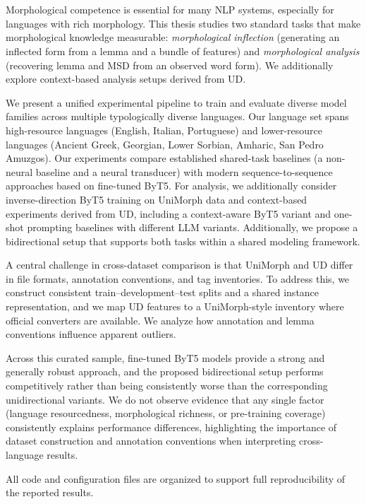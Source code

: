 \chapter{\abstractname}

Morphological competence is essential for many \ac{NLP} systems, especially for languages with rich morphology. This thesis studies two standard tasks that make morphological knowledge measurable: \emph{morphological inflection} (generating an inflected form from a lemma and a bundle of features) and \emph{morphological analysis} (recovering lemma and \ac{MSD} from an observed word form). We additionally explore context-based analysis setups derived from \ac{UD}.

We present a unified experimental pipeline to train and evaluate diverse model families across multiple typologically diverse languages. Our language set spans high-resource languages (English, Italian, Portuguese) and lower-resource languages (Ancient Greek, Georgian, Lower Sorbian, Amharic, San Pedro Amuzgos). Our experiments compare established shared-task baselines (a non-neural baseline and a neural transducer) with modern sequence-to-sequence approaches based on fine-tuned ByT5. For analysis, we additionally consider inverse-direction ByT5 training on UniMorph data and context-based experiments derived from \ac{UD}, including a context-aware ByT5 variant and one-shot prompting baselines with different \ac{LLM} variants. Additionally, we propose a bidirectional setup that supports both tasks within a shared modeling framework. 

A central challenge in cross-dataset comparison is that UniMorph and \ac{UD} differ in file formats, annotation conventions, and tag inventories. To address this, we construct consistent train--development--test splits and a shared instance representation, and we map \ac{UD} features to a UniMorph-style inventory where official converters are available. We analyze how annotation and lemma conventions influence apparent outliers.

Across this curated sample, fine-tuned ByT5 models provide a strong and generally robust approach, and the proposed bidirectional setup performs competitively rather than being consistently worse than the corresponding unidirectional variants. We do not observe evidence that any single factor (language resourcedness, morphological richness, or pre-training coverage) consistently explains performance differences, highlighting the importance of dataset construction and annotation conventions when interpreting cross-language results.

All code and configuration files are organized to support full reproducibility of the reported results.
